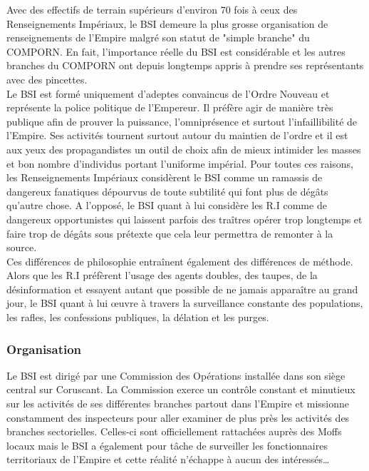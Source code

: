 \documentclass[twoside]{article}
\begin{document}
Avec des effectifs de terrain supérieurs d'environ 70 fois à ceux des Renseignements Impériaux, le BSI demeure la plus grosse organisation de renseignements de l'Empire malgré son statut de "simple branche" du COMPORN. En fait, l'importance réelle du BSI est considérable et les autres branches du COMPORN ont depuis longtemps appris à prendre ses représentants avec des pincettes.\\

Le BSI est formé uniquement d'adeptes convaincus de l'Ordre Nouveau et représente la police politique de l'Empereur. Il préfère agir de manière très publique afin de prouver la puissance, l'omniprésence et surtout l'infaillibilité de l'Empire. Ses activités tournent surtout autour du maintien de l'ordre et il est aux yeux des propagandistes un outil de choix afin de mieux intimider les masses et bon nombre d'individus portant l'uniforme impérial. Pour toutes ces raisons, les Renseignements Impériaux considèrent le BSI comme un ramassis de dangereux fanatiques dépourvus de toute subtilité qui font plus de dégâts qu'autre chose. A l'opposé, le BSI quant à lui considère les R.I comme de dangereux opportunistes qui laissent parfois des tra\^{i}tres opérer trop longtemps et faire trop de dégâts sous prétexte que cela leur permettra de remonter à la source.\\

Ces différences de philosophie entra\^{i}nent également des différences de méthode. Alors que les R.I préfèrent l'usage des agents doubles, des taupes, de la désinformation et essayent autant que possible de ne jamais appara\^{i}tre au grand jour, le BSI quant à lui \oe uvre à travers la surveillance constante des populations, les rafles, les confessions publiques, la délation et les purges.

\subsubsection{Organisation}
Le BSI est dirigé par une Commission des Opérations installée dans son siège central sur Coruscant. La Commission exerce un contrôle constant et minutieux sur les activités de ses différentes branches partout dans l'Empire et missionne constamment des inspecteurs pour aller examiner de plus près les activités des branches sectorielles. Celles-ci sont officiellement rattachées auprès des Moffs locaux mais le BSI a également pour tâche de surveiller les fonctionnaires territoriaux de l'Empire et cette réalité n'échappe à aucun des intéressés\ldots
\end{document}
